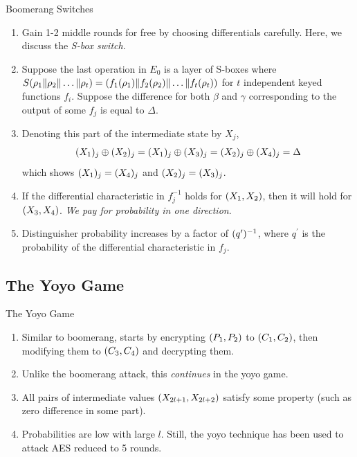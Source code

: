 \documentclass[notheorems]{beamer}
\theoremstyle{definition}
\theoremstyle{example}
\begin{document}
    \begin{frame}[<+->]{Boomerang Switches}
        \begin{enumerate}
            \item Gain 1-2 middle rounds for free by choosing differentials
            carefully. Here, we discuss the \emph{S-box switch}.
            \item Suppose the last operation in \(E_0\) is a layer of S-boxes
            where \(S(\rho_1\|\rho_2\|\ldots\|\rho_t) =
            (f_1(\rho_1)\|f_2(\rho_2)\|\ldots\|f_t(\rho_t))\)             
            for \(t\) independent keyed functions \(f_i\). Suppose the
            difference for both \(\beta\) and \(\gamma\) corresponding to the
            output of some \(f_j\) is equal to \(\Delta\). 
            \item Denoting this part of the intermediate state by \(X_j\),
            \begin{equation}
                (X_1)_j \oplus (X_2)_j = (X_1)_j \oplus (X_3)_j = (X_2)_j \oplus (X_4)_j = \Delta
                \label{eq:s-switch}
            \end{equation}
            which shows \((X_1)_j = (X_4)_j\) and \((X_2)_j =
            (X_3)_j\).
            \item If the differential characteristic in \(f_j^{-1}\) holds for
            \((X_1, X_2)\), then it will hold for \((X_3, X_4)\).
            \emph{We pay for probability in one direction}.
            \item Distinguisher probability increases by a factor of
            \((q^\prime)^{-1}\), where \(q^\prime\) is the probability of
            the differential characteristic in \(f_j\).
        \end{enumerate}
    \end{frame}

    \subsection{The Yoyo Game}
    \label{subsec:yoyo-game}
    
    \begin{frame}[<+->]{The Yoyo Game}
        \begin{enumerate}
            \item Similar to boomerang, starts by encrypting \((P_1, P_2)\)
            to \((C_1, C_2)\), then modifying them to \((C_3, C_4)\)
            and decrypting them.
            \item Unlike the boomerang attack, this \emph{continues} in the yoyo
            game.
            \item All pairs of intermediate values \((X_{2l + 1}, X_{2l +
            2})\) satisfy some property (such as zero difference in some part).
            \item Probabilities are low with large \(l\). Still, the yoyo
            technique has been used to attack AES reduced to 5 rounds.
        \end{enumerate}
    \end{frame}
\end{document}
